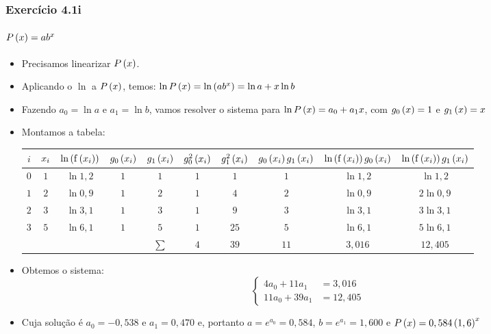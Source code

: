 \begin{frame}
\frametitle{Exercício 4.1i}
\framesubtitle{$P\left(x\right) = a b^x$}
\scriptsize
\begin{itemize}[<+->]
  \item Precisamos linearizar $P \left(x \right)$.
  \item Aplicando o $\ln$ a $P \left(x \right)$, temos: $\operatorname{\mathrm{ln}} P\left(x\right) = \operatorname{\mathrm{ln}} \left(a b ^ x\right) = \operatorname{\mathrm{ln}} a + x \operatorname{\mathrm{ln}} b$
  \item Fazendo $a_0 = \ln a$ e $a_1 = \ln b$, vamos resolver o sistema para $\operatorname{\mathrm{ln}} P \left(x\right) = a_0 + a_1 x$, com $g_0\left(x\right) = 1$ e $g_1 \left(x\right) = x$
  \item Montamos a tabela:
\begin{tabular}{c|c|c|c|c|c|c|c|c|c}
$i$ & 
  $x_i$ & 
  $\operatorname{\mathrm{ln}} \left( \mathrm{f} \left(x_i\right) \right)$ &
  $g_0 \left(x_i\right)$ &
  $g_1 \left(x_i\right)$ &
  $g_0^2 \left(x_i\right)$ &
  $g_1^2 \left(x_i\right)$ &
  $g_0 \left(x_i\right) g_1 \left(x_i\right)$ &
  $\operatorname{\mathrm{ln}} \left(\mathrm{f} \left(x_i\right) \right) g_0 \left(x_i\right)$ &
  $\operatorname{\mathrm{ln}} \left(\mathrm{f} \left(x_i\right) \right) g_1 \left(x_i\right)$\\
\hline
$0$ & $1$ & $\ln 1,2$ & $1$ & $1$ & $1$ & $1$  & $1$ & $\ln 1,2$ & $\ln 1,2$\\
\hline
$1$ & $2$ & $\ln 0,9$ & $1$ & $2$ & $1$ & $4$  & $2$ & $\ln 0,9$ & $2 \ln 0,9$\\
\hline
$2$ & $3$ & $\ln 3,1$ & $1$ & $3$ & $1$ & $9$  & $3$ & $\ln 3,1$ & $3 \ln 3,1$\\
\hline
$3$ & $5$ & $\ln 6,1$ & $1$ & $5$ & $1$ & $25$ & $5$ & $\ln 6,1$ & $5 \ln 6,1$\\
\hline
& & & & $\sum$ & $4$ & $39$ & $11$ & $3,016$ & $12,405$  
\end{tabular}
  \item Obtemos o sistema:
\[
\begin{cases}
4 a_0 + 11 a_1 &= 3,016\\
%
11 a_0 + 39 a_1 &= 12,405
\end{cases}
\]
  \item Cuja solução é $a_0 = -0,538$ e $a_1 = 0,470$ e, portanto $a = e^{a_0} = 0,584$, $b = e^{a_1} = 1,600$ e $P\left(x\right) = 0,584 \left(1,6\right)^x$
\end{itemize}

\end{frame}